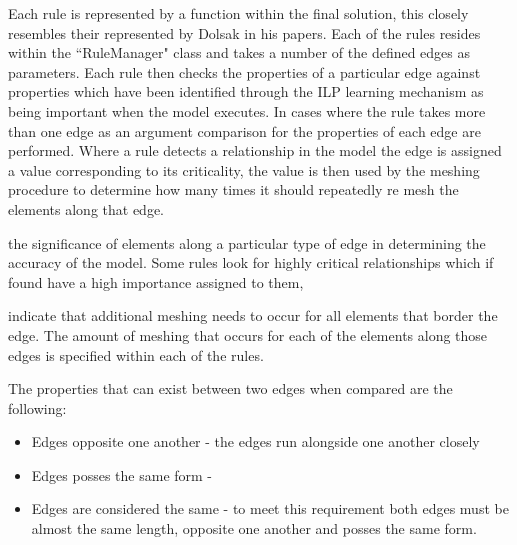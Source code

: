 \documentclass{article}
\begin{document}
Each rule is represented by a function within the final solution, this closely resembles their represented by Dolsak in his papers. Each of the rules resides within the ``RuleManager" class and takes a number of the defined edges as parameters. Each rule then checks the properties of a particular edge against properties which have been identified through the ILP learning mechanism as being important when the model executes. In cases where the rule takes more than one edge as an argument comparison for the properties of each edge are performed. Where a rule detects a relationship in the model the edge is assigned a value corresponding to its criticality, the value is then used by the meshing procedure to determine how many times it should repeatedly re mesh the elements along that edge.


 the significance of elements along a particular type of edge in determining the accuracy of the model. Some rules look for highly critical relationships  which if found have a high importance assigned to them, 

indicate that additional meshing needs to occur for all elements that border the edge. The amount of meshing that occurs for each of the elements along those edges is specified within each of the rules.

The properties that can exist between two edges when compared are the following:

\begin{itemize}
\item Edges opposite one another - the edges run alongside one another closely
\item Edges posses the same form - 

\item Edges are considered the same - to meet this requirement both edges must be almost the same length, opposite one another and posses the same form.

\end{itemize}
\end{document}

